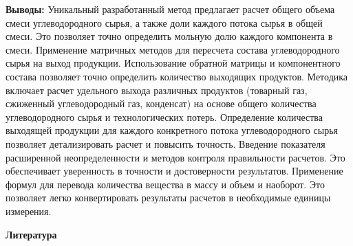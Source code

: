\begin{multicols}{2}
{\bfseries Выводы:} Уникальный разработанный метод предлагает расчет общего
объема смеси углеводородного сырья, а также доли каждого потока сырья в
общей смеси. Это позволяет точно определить мольную долю каждого
компонента в смеси. Применение матричных методов для пересчета состава
углеводородного сырья на выход продукции. Использование обратной матрицы
и компонентного состава позволяет точно определить количество выходящих
продуктов. Методика включает расчет удельного выхода различных продуктов
(товарный газ, сжиженный углеводородный газ, конденсат) на основе общего
количества углеводородного сырья и технологических потерь. Определение
количества выходящей продукции для каждого конкретного потока
углеводородного сырья позволяет детализировать расчет и повысить
точность. Введение показателя расширенной неопределенности и методов
контроля правильности расчетов. Это обеспечивает уверенность в точности
и достоверности результатов. Применение формул для перевода количества
вещества в массу и объем и наоборот. Это позволяет легко конвертировать
результаты расчетов в необходимые единицы измерения.
\end{multicols}

\begin{center}
{\bfseries Литература}
\end{center}

